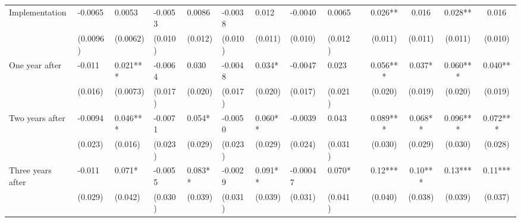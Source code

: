 \begin{tabular}{lccccrrrrrcccc}
Implementation & \multicolumn{1}{l}{-0.0065} & \multicolumn{1}{l}{0.0053} & \multicolumn{1}{l}{-0.0053} & \multicolumn{1}{l}{0.0086} & \multicolumn{1}{l}{-0.0038} & \multicolumn{1}{l}{0.012} & \multicolumn{1}{l}{-0.0040} & \multicolumn{1}{l}{0.0065} &       & 0.026** & 0.016 & 0.028** & 0.016 \\
      & \multicolumn{1}{l}{(0.0096)} & \multicolumn{1}{l}{(0.0062)} & \multicolumn{1}{l}{(0.010)} & \multicolumn{1}{l}{(0.012)} & \multicolumn{1}{l}{(0.010)} & \multicolumn{1}{l}{(0.011)} & \multicolumn{1}{l}{(0.010)} & \multicolumn{1}{l}{(0.012)} &       & (0.011) & (0.011) & (0.011) & (0.010) \\
One year after & \multicolumn{1}{l}{-0.011} & \multicolumn{1}{l}{0.021***} & \multicolumn{1}{l}{-0.0064} & \multicolumn{1}{l}{0.030} & \multicolumn{1}{l}{-0.0048} & \multicolumn{1}{l}{0.034*} & \multicolumn{1}{l}{-0.0047} & \multicolumn{1}{l}{0.023} &       & 0.056*** & 0.037* & 0.060*** & 0.040** \\
      & \multicolumn{1}{l}{(0.016)} & \multicolumn{1}{l}{(0.0073)} & \multicolumn{1}{l}{(0.017)} & \multicolumn{1}{l}{(0.020)} & \multicolumn{1}{l}{(0.017)} & \multicolumn{1}{l}{(0.020)} & \multicolumn{1}{l}{(0.017)} & \multicolumn{1}{l}{(0.021)} &       & (0.020) & (0.019) & (0.020) & (0.019) \\
Two years after & \multicolumn{1}{l}{-0.0094} & \multicolumn{1}{l}{0.046***} & \multicolumn{1}{l}{-0.0071} & \multicolumn{1}{l}{0.054*} & \multicolumn{1}{l}{-0.0050} & \multicolumn{1}{l}{0.060**} & \multicolumn{1}{l}{-0.0039} & \multicolumn{1}{l}{0.043} &       & 0.089*** & 0.068** & 0.096*** & 0.072*** \\
      & \multicolumn{1}{l}{(0.023)} & \multicolumn{1}{l}{(0.016)} & \multicolumn{1}{l}{(0.023)} & \multicolumn{1}{l}{(0.029)} & \multicolumn{1}{l}{(0.023)} & \multicolumn{1}{l}{(0.029)} & \multicolumn{1}{l}{(0.024)} & \multicolumn{1}{l}{(0.031)} &       & (0.030) & (0.029) & (0.030) & (0.028) \\
Three years after & \multicolumn{1}{l}{-0.011} & \multicolumn{1}{l}{0.071*} & \multicolumn{1}{l}{-0.0055} & \multicolumn{1}{l}{0.083**} & \multicolumn{1}{l}{-0.0029} & \multicolumn{1}{l}{0.091**} & \multicolumn{1}{l}{-0.00047} & \multicolumn{1}{l}{0.070*} &       & 0.12*** & 0.10*** & 0.13*** & 0.11*** \\
      & \multicolumn{1}{l}{(0.029)} & \multicolumn{1}{l}{(0.042)} & \multicolumn{1}{l}{(0.030)} & \multicolumn{1}{l}{(0.039)} & \multicolumn{1}{l}{(0.031)} & \multicolumn{1}{l}{(0.039)} & \multicolumn{1}{l}{(0.031)} & \multicolumn{1}{l}{(0.041)} &       & (0.040) & (0.038) & (0.039) & (0.037) \\

\end{tabular}
